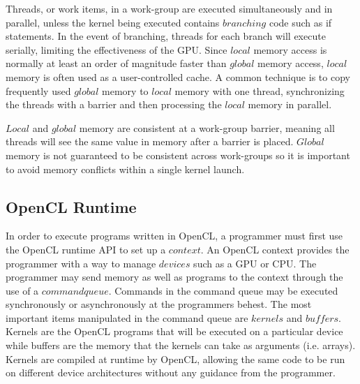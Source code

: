 Threads, or work items, in a work-group are executed simultaneously and in
parallel, unless the kernel being executed contains $branching$ code such as if
statements. In the event of branching, threads for each branch will execute
serially, limiting the effectiveness of the GPU. Since $local$ memory
access is normally at least an order of magnitude faster than $global$ memory
access, $local$ memory is often used as a user-controlled cache. A common
technique is to copy frequently used $global$ memory to $local$ memory with one
thread, synchronizing the threads with a barrier and then processing the
$local$ memory in parallel. 


$Local$ and $global$ memory are consistent at a work-group barrier, meaning all
threads will see the same value in memory after a barrier is placed. $Global$
memory is not guaranteed to be consistent across work-groups so it is important
to avoid memory conflicts within a single kernel launch.

\subsection{OpenCL Runtime}

In order to execute programs written in OpenCL, a programmer must first use the
OpenCL runtime API to set up a $context$. An OpenCL context provides the
programmer with a way to manage $devices$ such as
a GPU or CPU. The programmer may send memory as well as programs to the context
through the use of a $command queue$. Commands in the command queue may be
executed synchronously or asynchronously at the programmers behest. The most
important items manipulated in the command queue are $kernels$ and $buffers$.
Kernels are the OpenCL programs that will be executed on a particular device
while buffers are the memory that the kernels can take as arguments (i.e.
arrays). Kernels are compiled at runtime by OpenCL, allowing the same code to
be run on different device architectures without any guidance from the
programmer.



